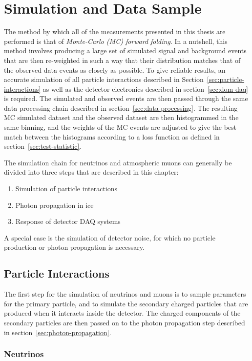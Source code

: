 \section{Simulation and Data Sample}

The method by which all of the measurements presented in this thesis are performed is that of \emph{Monte-Carlo (MC) forward folding}. In a nutshell, this method involves producing a large set of simulated signal and background events that are then re-weighted in such a way that their distribution matches that of the observed data events as closely as possible. To give reliable results, an accurate simulation of all particle interactions described in Section~\ref{sec:particle-interactions} as well as the detector electronics described in section~\ref{sec:dom-daq} is required. The simulated and observed events are then passed through the same data processing chain described in section~\ref{sec:data-processing}. The resulting MC simulated dataset and the observed dataset are then histogrammed in the same binning, and the weights of the MC events are adjusted to give the best match between the histograms according to a loss function as defined in section~\ref{sec:test-statistic}.

The simulation chain for neutrinos and atmospheric muons can generally be divided into three steps that are described in this chapter:
\begin{enumerate}
    \item Simulation of particle interactions
    \item Photon propagation in ice
    \item Response of detector DAQ systems
\end{enumerate}
A special case is the simulation of detector noise, for which no particle production or photon propagation is necessary.

\subsection{Particle Interactions}

The first step for the simulation of neutrinos and muons is to sample parameters for the primary particle, and to simulate the secondary charged particles that are produced when it interacts inside the detector. The charged components of the secondary particles are then passed on to the photon propagation step described in section~\ref{sec:photon-propagation}.

\subsubsection{Neutrinos}

